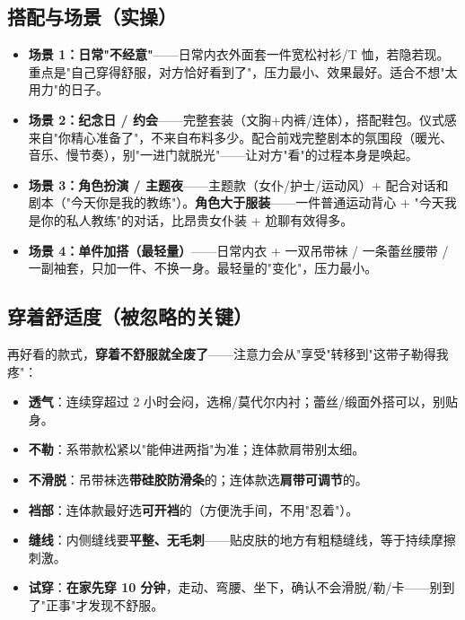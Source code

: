 \documentclass[12pt,UTF8,openany]{ctexbook}
\begin{document}
\subsection*{搭配与场景（实操）}
\begin{itemize}[leftmargin=2em,itemsep=0.4em]
  \item \textbf{场景 1：日常"不经意"}——日常内衣外面套一件宽松衬衫/T 恤，若隐若现。重点是"自己穿得舒服，对方恰好看到了"，压力最小、效果最好。适合不想"太用力"的日子。
  \item \textbf{场景 2：纪念日 / 约会}——完整套装（文胸+内裤/连体），搭配鞋包。仪式感来自"你精心准备了"，不来自布料多少。配合前戏完整剧本的氛围段（暖光、音乐、慢节奏），别"一进门就脱光"——让对方"看"的过程本身是唤起。
  \item \textbf{场景 3：角色扮演 / 主题夜}——主题款（女仆/护士/运动风）+ 配合对话和剧本（"今天你是我的教练"）。\textbf{角色大于服装}——一件普通运动背心 + "今天我是你的私人教练"的对话，比昂贵女仆装 + 尬聊有效得多。
  \item \textbf{场景 4：单件加搭（最轻量）}——日常内衣 + 一双吊带袜 / 一条蕾丝腰带 / 一副袖套，只加一件、不换一身。最轻量的"变化"，压力最小。
\end{itemize}

\subsection*{穿着舒适度（被忽略的关键）}
再好看的款式，\textbf{穿着不舒服就全废了}——注意力会从"享受"转移到"这带子勒得我疼"：
\begin{itemize}[leftmargin=2em,itemsep=0.3em]
  \item \textbf{透气}：连续穿超过 2 小时会闷，选棉/莫代尔内衬；蕾丝/缎面外搭可以，别贴身。
  \item \textbf{不勒}：系带款松紧以"能伸进两指"为准；连体款肩带别太细。
  \item \textbf{不滑脱}：吊带袜选\textbf{带硅胶防滑条}的；连体款选\textbf{肩带可调节}的。
  \item \textbf{裆部}：连体款最好选\textbf{可开裆}的（方便洗手间，不用"忍着"）。
  \item \textbf{缝线}：内侧缝线要\textbf{平整、无毛刺}——贴皮肤的地方有粗糙缝线，等于持续摩擦刺激。
  \item \textbf{试穿}：\textbf{在家先穿 10 分钟}，走动、弯腰、坐下，确认不会滑脱/勒/卡——别到了"正事"才发现不舒服。
\end{itemize}
\end{document}
